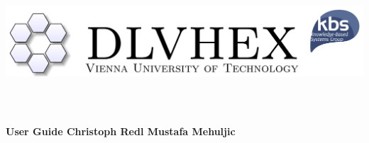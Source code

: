 \documentclass[14pt,a4paper, titlepage]{article}
\begin{document}
\setcounter{page}{3}
\newcommand{\dlvhex}{{\sc dlvhex}}
\newcommand{\hex}{{\sc hex}}
\setcounter{secnumdepth}{4} %
\setcounter{tocdepth}{4}    %

\begin{titlepage}
    \centering
    \vfill
    \includegraphics[width=15cm,height=6cm]{biglogo_whitebg}
    \vfill
    {\bfseries\Large
        User Guide
        \vskip4cm
        Christoph Redl\vskip1cm Mustafa Mehuljic
    }    
    
\end{titlepage}

\begin{abstract}
This document provides a user guide for the Answer Set Programming(ASP) system called \dlvhex{} developed at Vienna University of Technology. ASP is a declarative problem solving paradigm, rooted in Logic Programming and Nonmonotonic Reasoning, which has been gaining increasing attention during the last years. The \dlvhex{} system is a logic-programming reasoner for computing the models of so-called \hex{}-programs, which are an extension of \emph{answer-set programs} towards integration of \emph{external computation sources}. This guide aims at enabling users of this system to interoperate with a broader set of external computation sources. The guide refers to release 2.4.     
\end{abstract}

\tableofcontents
\newpage
\end{document}
